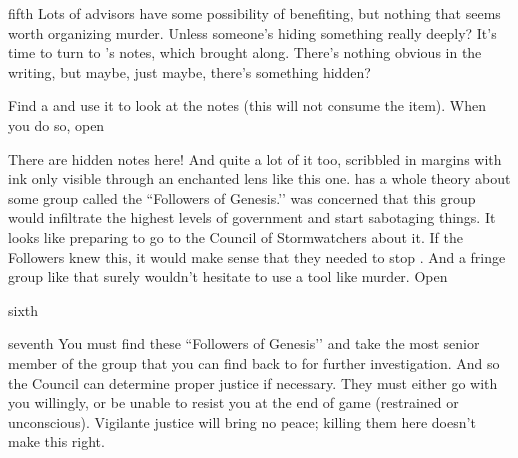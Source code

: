 \documentclass[notebook]{GL2020} %
\begin{document}
\begin{page}{fifth}
Lots of advisors have some possibility of benefiting, but nothing that seems worth organizing murder. Unless someone’s hiding something really deeply? It’s time to turn to \cHeadDiplomat{}’s notes, which \cJuniorStatesman{} brought along. There’s nothing obvious in the writing, but maybe, just maybe, there’s something hidden?

Find a \iCrystalLens{} and use it to look at the notes (this will not consume the item). When you do so, open 
\end{page}

There are hidden notes here! And quite a lot of it too, scribbled in margins with ink only visible through an enchanted lens like this one. \cHeadDiplomat{} has a whole theory about some group called the ``Followers of Genesis.’’ \cHeadDiplomat{} was concerned that this group would infiltrate the highest levels of government and start sabotaging things. It looks like \cHeadDiplomat{\they} \cHeadDiplomat{\were} preparing to go to the Council of Stormwatchers about it. If the Followers knew this, it would make sense that they needed to stop \cHeadDiplomat{}. And a fringe group like that surely wouldn’t hesitate to use a tool like murder. Open 
\begin{page}{sixth}
\end{page}

\begin{page}{seventh}
You must find these ``Followers of Genesis’’ and take the most senior member of the group that you can find back to \pShip{} for further investigation. And so the Council can determine proper justice if necessary. They must either go with you willingly, or be unable to resist you at the end of game (restrained or unconscious). Vigilante justice will bring no peace; killing them here doesn’t make this right.
\end{page}

\endnotebook
\end{document}
